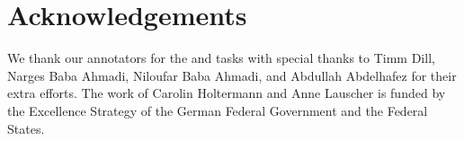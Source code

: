 \section*{Acknowledgements}
\label{sec:ack}
%
We thank our annotators for the \sivqa and \vvqa tasks with special thanks to Timm Dill, Narges Baba Ahmadi, Niloufar Baba Ahmadi, and Abdullah Abdelhafez for their extra efforts.
The work of Carolin Holtermann and Anne Lauscher is funded by the Excellence Strategy of the German Federal Government and the Federal States.
